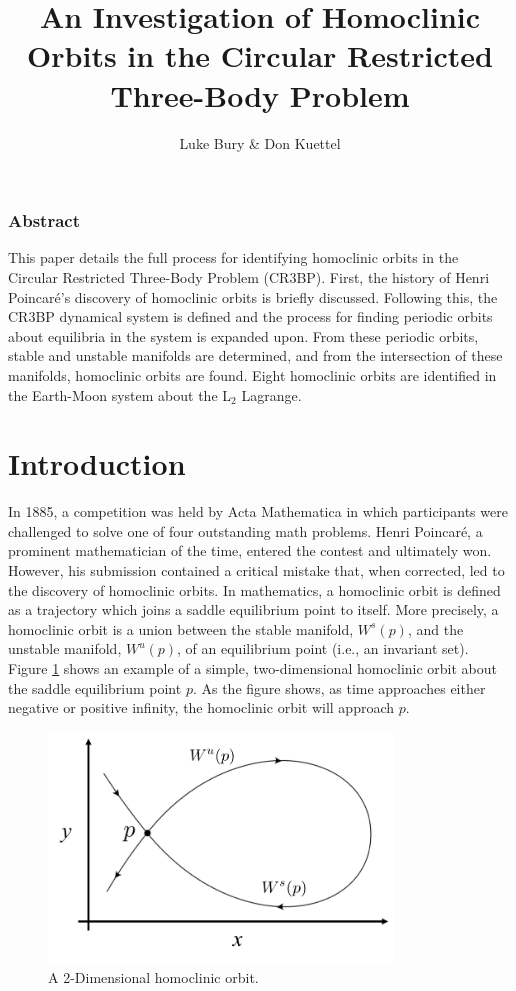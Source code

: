 \documentclass[11pt]{article} %
\title{An Investigation of Homoclinic Orbits in the Circular Restricted Three-Body Problem}
\author{Luke Bury \& Don Kuettel}
\begin{document}
\maketitle
\subsubsection*{\centering Abstract}
This paper details the full process for identifying homoclinic orbits in the Circular Restricted Three-Body Problem (CR3BP). First, the history of Henri Poincaré's discovery of homoclinic orbits is briefly discussed. Following this, the CR3BP dynamical system is defined and the process for finding periodic orbits about equilibria in the system is expanded upon. From these periodic orbits, stable and unstable manifolds are determined, and from the intersection of these manifolds, homoclinic orbits are found. Eight homoclinic orbits are identified in the Earth-Moon system about the L$_2$ Lagrange.

\section{Introduction}
In 1885, a competition was held by Acta Mathematica in which participants were challenged to solve one of four outstanding math problems. Henri Poincaré, a prominent mathematician of the time, entered the contest and ultimately won. However, his submission contained a critical mistake that, when corrected, led to the discovery of homoclinic orbits. In mathematics, a homoclinic orbit is defined as a trajectory which joins a saddle equilibrium point to itself. More precisely, a homoclinic orbit is a union between the stable manifold, $W^s(p)$, and the unstable manifold, $W^u(p)$, of an equilibrium point (i.e., an invariant set). Figure \ref{f:homoclinic_example} shows an example of a simple, two-dimensional homoclinic orbit about the saddle equilibrium point $p$. As the figure shows, as time approaches either negative or positive infinity, the homoclinic orbit will approach $p$. 

\begin{figure}[H]
    \centering
    \includegraphics[width=3.6in]{homoclinic_orbit.png}
    \caption{A 2-Dimensional homoclinic orbit.}
    \label{f:homoclinic_example}
\end{figure}
\end{document}
